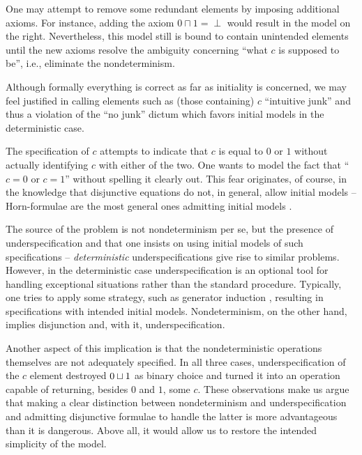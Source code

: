 {\begin{Example}
\noindent
One may attempt to remove some redundant elements by imposing additional axioms. For 
instance, adding the axiom $0\sqcap 1=\perp$ would result in the model on the
right. Nevertheless, this model still is bound to contain unintended elements
until the new axioms resolve the ambiguity concerning
``what $c$ is supposed to be'', i.e., eliminate the nondeterminism.
\end{Example}
Although formally everything 
is correct as far as initiality is concerned, we may feel justified in 
calling elements such as (those containing) $c$ ``intuitive junk'' 
and thus a violation of the 
``no junk'' dictum which favors initial models in the deterministic case.

The specification of $c$ attempts to indicate that $c$ is equal to $0$
or $1$ without actually identifying $c$ with either of the two. One
wants to model the fact that ``$c=0$ or $c=1$'' without spelling it
clearly out.  This fear originates, of course, in the knowledge that
disjunctive equations do not, in general, allow initial models --
Horn-formulae are the most general ones admitting initial models \cite{c:78,
c:76, c:122}.

The source of the problem is not nondeterminism per se, but the
presence of underspecification and that one insists on using initial
models of such specifications -- {\em deterministic\/} underspecifications
give rise to similar problems. However, in the deterministic case
underspecification is an optional tool for handling exceptional
situations rather than the standard procedure. Typically, one tries to
apply some strategy, such as generator induction \cite{c:genind, c:28, c:44,
c:60}, resulting in specifications with intended initial models.
Nondeterminism, on the other hand, implies disjunction and, with it,
underspecification.

Another aspect of this implication is that the nondeterministic operations themselves are not 
adequately specified. In all three cases, underspecification of the 
$c$ element destroyed $0\sqcup 1$ as binary choice 
and turned it into an operation capable of returning, besides $0$ and $1$, some $c$. These observations make us 
argue that making a clear distinction between nondeterminism and underspecification and admitting 
disjunctive formulae to handle the latter is more advantageous than it is dangerous. Above all, it would 
allow us to restore the intended simplicity of the model. 

}
